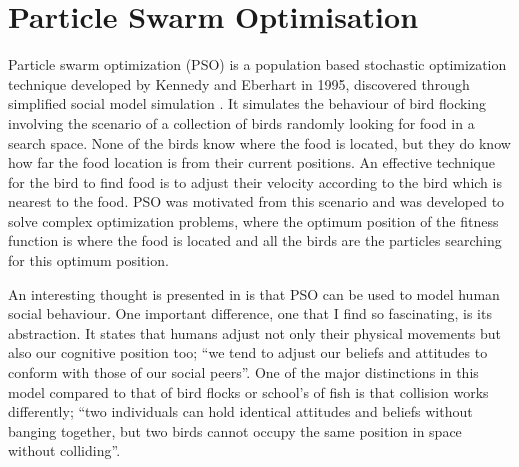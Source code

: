 \documentclass{pdfmx4020}
\begin{document}
  \section{Particle Swarm Optimisation} %
  \label{sec:particle_swarm_optimisation}


  Particle swarm optimization (PSO) is a population based  stochastic optimization technique developed by Kennedy and  Eberhart in 1995, discovered through simplified social model simulation \cite{pso,pso2,pso3,pso4}. It simulates the behaviour of bird flocking involving the scenario of a collection of birds randomly looking for food in a search space. None of the birds know where the food is located, but they do know how far the food location is from their current positions. An effective technique for the bird to find food is to adjust their velocity according to the bird which is nearest to the food. PSO was motivated from this scenario and was developed to solve complex optimization problems, where the optimum position of the fitness function is where the food is located and all the birds are the particles searching for this optimum position. 

  An interesting thought is presented in \cite{pso} is that PSO can be used to model human social behaviour. One important difference, one that I find so fascinating, is its abstraction. It states that humans adjust not only their physical movements but also our cognitive position too; ``we tend to adjust our beliefs and attitudes to conform with those of our social peers''\cite{pso}. One of the major distinctions in this model compared to that of bird flocks or school's of fish is that collision works differently; ``two individuals can hold identical attitudes and beliefs without banging together, but two birds cannot occupy the same position in space without colliding''.
\end{document}
